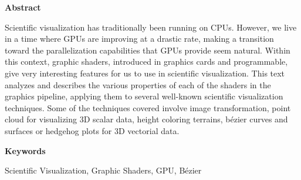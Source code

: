 
\newpage

\thispagestyle{empty}

\begin{center}

{\bf \Huge Abstract}

  \end{center}
\vspace{1cm}

	Scientific visualization has traditionally been running on CPUs. However, we
	live in a time where GPUs are improving at a drastic rate, making a
	transition toward the parallelization capabilities that GPUs provide seem
	natural.  Within this context, graphic shaders, introduced in graphics cards
	and programmable, give very interesting features for us to use in scientific
	visualization. This text analyzes and describes the various properties of
	each of the shaders in the graphics pipeline, applying them to several
	well-known scientific visualization techniques. Some of the techniques
	covered involve image transformation, point cloud for visualizing 3D scalar
	data, height coloring terrains, bézier curves and surfaces or hedgehog plots
	for 3D vectorial data.

\vspace{1cm}


\begin{center}

{\bf \Large Keywords}

   \end{center}

   \vspace{0.5cm}
   
	Scientific Visualization, Graphic Shaders, GPU, Bézier
   


